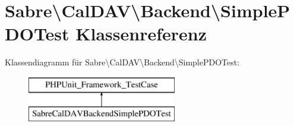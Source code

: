 \hypertarget{class_sabre_1_1_cal_d_a_v_1_1_backend_1_1_simple_p_d_o_test}{}\section{Sabre\textbackslash{}Cal\+D\+AV\textbackslash{}Backend\textbackslash{}Simple\+P\+D\+O\+Test Klassenreferenz}
\label{class_sabre_1_1_cal_d_a_v_1_1_backend_1_1_simple_p_d_o_test}
Klassendiagramm für Sabre\textbackslash{}Cal\+D\+AV\textbackslash{}Backend\textbackslash{}Simple\+P\+D\+O\+Test\+:\begin{figure}[H]
\begin{center}
\leavevmode
\includegraphics[height=2.000000cm]{class_sabre_1_1_cal_d_a_v_1_1_backend_1_1_simple_p_d_o_test}
\end{center}
\end{figure}
